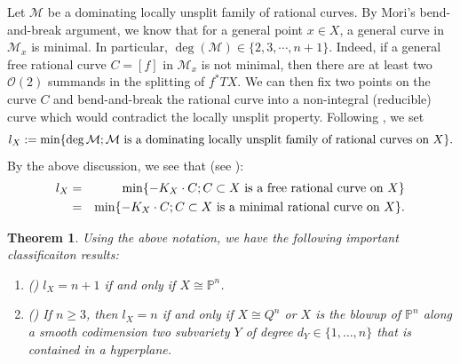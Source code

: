 \documentclass[12pt]{amsart}
\newtheorem{thm}{Theorem}[section]
\theoremstyle{definition}
\def\min{{\rm min}}
\newcommand{\IP}{{\mathbb P}}
\newcommand{\CM}{{\mathcal M}}
\newcommand{\CO}{{\mathcal O}}
\begin{document}
Let $\CM$ be a dominating locally unsplit family of rational curves. By Mori's bend-and-break argument, we know that for a general point $x\in X$, a general curve in $\CM_x$ is minimal. In particular, $\deg(\CM)\in \{2, 3, \cdots, n+1\}$. Indeed, if a general free rational curve $C=[f]$ in $\CM_x$ is not minimal, then there are at least two $\CO(2)$ summands in the splitting of $f^*TX$. We can then fix two points on the curve $C$ and bend-and-break the rational curve into a non-integral (reducible) curve which would contradict the locally unsplit property. 
Following \cite{Miy04, CD15}, we set 
\begin{equation}\label{eq-lX1}
    l_X:=\min\{\deg \CM; \CM \text{ is a dominating locally unsplit family of rational curves on } X\}.
\end{equation}
By the above discussion, we see that (see \cite[Remark 4.2]{CD15}): 
\begin{eqnarray}\label{eq-lX}
    l_X&=&\min\{-K_X\cdot C; C\subset X \text{ is a free rational curve on } X\}\nonumber \\
    &=& \min\{-K_X\cdot C; C\subset X \text{ is a minimal rational curve on } X\}.
\end{eqnarray} 
\begin{thm}\label{thm-lX}
Using the above notation, we have the following important classificaiton results: 
\begin{enumerate}
    \item (\cite{CMS02}) $l_X=n+1$ if and only if $X\cong \IP^n$. 
    \item (\cite{Miy04, CD15, DH17}) If $n\geq 3$, then $l_X=n$ if and only if $X\cong Q^n$ or $X$ is the blowup of $\IP^n$ along a smooth codimension two subvariety $Y$ of degree $d_Y\in \{1,\dots, n\}$ that is contained in a hyperplane. 
\end{enumerate}
\end{thm}
\end{document}
